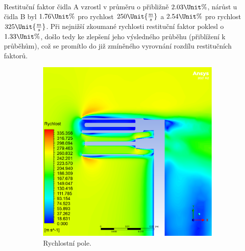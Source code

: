             Restituční faktor čidla A vzrostl v průměru o přibližně $2.03 \Unit{\%}$, nárůst u čidla B byl $1.76 \Unit{\%}$ pro rychlost $250 \Unit{\frac{m}{s}}$ a $2.54 \Unit{\%}$ pro rychlost $325 \Unit{\frac{m}{s}}$. Při nejnižší zkoumané rychlosti restituční faktor poklesl o $1.33 \Unit{\%}$, došlo tedy ke zlepšení jeho výsledného průběhu (přiblížení k  průběhům), což se promítlo do již zmíněného vyrovnání rozdílu restitučních faktorů.

            \begin{figure}[ht!]
                \centering
                \begin{subfigure}{0.45\textwidth}
                    \centering
                    \captionsetup{width=.9\linewidth}
                    \includegraphics[width=\textwidth]{500_FINAL/SIM_Final_XY0_rychlost.png}
                    \caption{Rychlostní pole.}
                \end{subfigure}
                \begin{subfigure}{0.45\textwidth}
                    \centering
                    \captionsetup{width=.9\linewidth}

\end{subfigure}
\end{figure}
